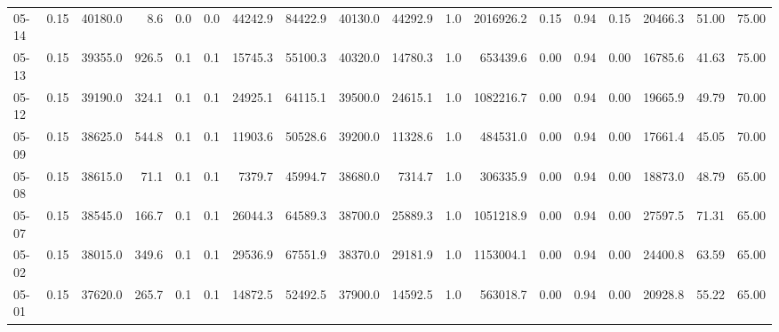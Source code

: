 \begin{threeparttable}
{\begin{tabular}{lrrrrrrrrrrrrrrrrr}
  05-14 &     0.15 & 40180.0 &               8.6 &               0.0 &                0.0 &            44242.9 & 84422.9 & 40130.0 &    44292.9 &                      1.0 &           2016926.2 &       0.15 &      0.94 &           0.15 &          20466.3 &           51.00 &                  75.00 \\
  05-13 &     0.15 & 39355.0 &             926.5 &               0.1 &                0.1 &            15745.3 & 55100.3 & 40320.0 &    14780.3 &                      1.0 &            653439.6 &       0.00 &      0.94 &           0.00 &          16785.6 &           41.63 &                  75.00 \\
  05-12 &     0.15 & 39190.0 &             324.1 &               0.1 &                0.1 &            24925.1 & 64115.1 & 39500.0 &    24615.1 &                      1.0 &           1082216.7 &       0.00 &      0.94 &           0.00 &          19665.9 &           49.79 &                  70.00 \\
  05-09 &     0.15 & 38625.0 &             544.8 &               0.1 &                0.1 &            11903.6 & 50528.6 & 39200.0 &    11328.6 &                      1.0 &            484531.0 &       0.00 &      0.94 &           0.00 &          17661.4 &           45.05 &                  70.00 \\
  05-08 &     0.15 & 38615.0 &              71.1 &               0.1 &                0.1 &             7379.7 & 45994.7 & 38680.0 &     7314.7 &                      1.0 &            306335.9 &       0.00 &      0.94 &           0.00 &          18873.0 &           48.79 &                  65.00 \\
  05-07 &     0.15 & 38545.0 &             166.7 &               0.1 &                0.1 &            26044.3 & 64589.3 & 38700.0 &    25889.3 &                      1.0 &           1051218.9 &       0.00 &      0.94 &           0.00 &          27597.5 &           71.31 &                  65.00 \\
  05-02 &     0.15 & 38015.0 &             349.6 &               0.1 &                0.1 &            29536.9 & 67551.9 & 38370.0 &    29181.9 &                      1.0 &           1153004.1 &       0.00 &      0.94 &           0.00 &          24400.8 &           63.59 &                  65.00 \\
  05-01 &     0.15 & 37620.0 &             265.7 &               0.1 &                0.1 &            14872.5 & 52492.5 & 37900.0 &    14592.5 &                      1.0 &            563018.7 &       0.00 &      0.94 &           0.00 &          20928.8 &           55.22 &                  65.00 \\

\end{tabular}}
\end{threeparttable}
